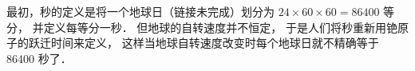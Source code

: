 
最初，秒的定义是将一个地球日（链接未完成）划分为 $24\times60\times60 = 86400$ 等分， 并定义每等分一秒． 但地球的自转速度并不恒定， 于是人们将秒重新用铯原子的跃迁时间来定义， 这样当地球自转速度改变时每个地球日就不精确等于 86400 秒了．
